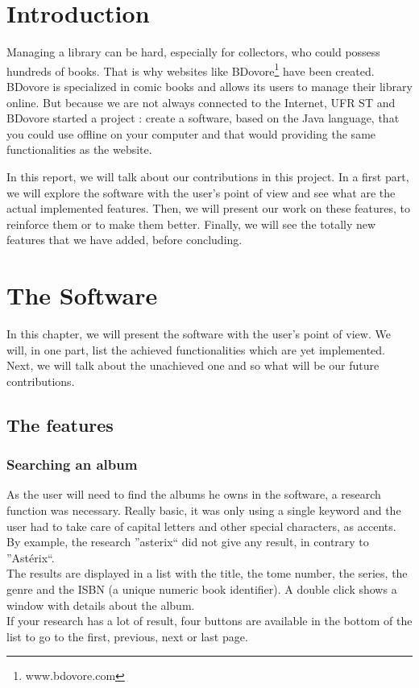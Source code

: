 \documentclass[11pt]{report} %
\begin{document}

\newpage
\tableofcontents
\newpage

\chapter{Introduction}
Managing a library can be hard, especially for collectors, who could possess hundreds of books. That is why websites like BDovore\footnote{www.bdovore.com} have been created. BDovore is specialized in comic books and allows its users to manage their library online. But because we are not always connected to the Internet, UFR ST and BDovore started a project : create a software, based on the Java language, that you could use offline on your computer and that would providing the same functionalities as the website.

In this report, we will talk about our contributions in this project. In a first part, we will explore the software with the user's point of view and see what are the actual implemented features. Then, we will present our work on these features, to reinforce them or to make them better. Finally, we will see the totally new features that we have added, before concluding.

\chapter{The Software}
In this chapter, we will present the software with the user's point of view. We will, in one part, list the achieved functionalities which are yet implemented. Next, we will talk about the unachieved one and so what will be our future contributions.

\section{The features}
\subsection{Searching an album}
As the user will need to find the albums he owns in the software, a research function was necessary. Really basic, it was only using a single keyword and the user had to take care of capital letters and other special characters, as accents. By example, the research ''asterix`` did not give any result, in contrary to ''Astérix``.\\
The results are displayed in a list with the title, the tome number, the series, the genre and the ISBN (a unique numeric book identifier). A double click shows a window with details about the album.\\
If your research has a lot of result, four buttons are available in the bottom of the list to go to the first, previous, next or last page.
\end{document}
